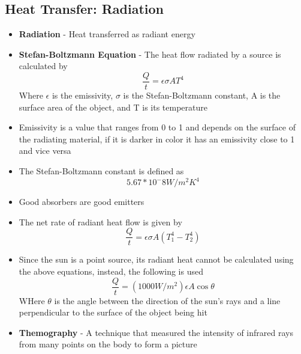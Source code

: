 \subsection{Heat Transfer: Radiation}
\begin{itemize}
    \item \textbf{Radiation} - Heat transferred as radiant energy
    \item \textbf{Stefan-Boltzmann Equation} - The heat flow radiated by a source is calculated by \[\frac{Q}{t}=\epsilon\sigma AT^4\] Where \(\epsilon\) is the emissivity, \(\sigma\) is the Stefan-Boltzmann constant, A is the surface area of the object, and T is its temperature
    \item Emissivity is a value that ranges from 0 to 1 and depends on the surface of the radiating material, if it is darker in color it has an emissivity close to 1 and vice versa
    \item The Stefan-Boltzmann constant is defined as \[5.67*10^-8W/m^2K^4\]
    \item Good absorbers are good emitters
    \item The net rate of radiant heat flow is given by \[\frac{Q}{t}=\epsilon\sigma A(T_1^4-T_2^4)\]
    \item Since the sun is a point source, its radiant heat cannot be calculated using the above equations, instead, the following is used \[\frac{Q}{t}=(1000W/m^2)\epsilon A\cos\theta\]
    WHere \(\theta\) is the angle between the direction of the sun's rays and a line perpendicular to the surface of the object being hit
    \item \textbf{Themography} - A technique that measured the intensity of infrared rays from many points on the body to form a picture
\end{itemize}

\newpage